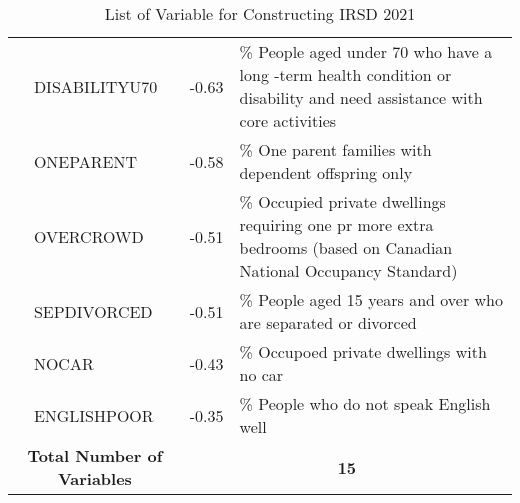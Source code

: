 \begin{table}[t]
{\begin{tabular}{c p{}c p{}}
                        & DISABILITYU70                  & -0.63            & \% People aged under 70 who have   a long -term health condition or disability and need assistance with core   activities \\ \cline{2-4}
                        & ONEPARENT                      & -0.58            & \% One parent families with   dependent offspring only                                                                    \\ \cline{2-4}
                        & OVERCROWD                      & -0.51            & \% Occupied private dwellings   requiring one pr more extra bedrooms (based on Canadian National Occupancy   Standard)    \\ \cline{2-4}
                        & SEPDIVORCED                    & -0.51            & \% People aged 15 years and over   who are separated or divorced                                                          \\ \cline{2-4}
                        & NOCAR                          & -0.43            & \% Occupoed private dwellings   with no car                                                                               \\ \cline{2-4}
                        & ENGLISHPOOR                    & -0.35            & \% People who do not speak   English well                                                                                 \\ \hline
\multicolumn{2}{c}{\textbf{Total Number   of Variables}} & \multicolumn{2}{c}{\textbf{15}}                                                                                                              \\ \hline
\end{tabular}
}
\caption{List of Variable for Constructing IRSD 2021}
\label{tbl-IRSDloading21}
\end{table}
